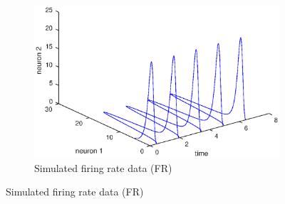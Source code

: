 \begin{figure}[tbh]
        \centering
        \begin{subfigure}[b]{0.475\textwidth}
            \centering
            \includegraphics[width=\textwidth]{./images/SimFiringRate-with-time.eps}
            \caption[]%
            {{\small Simulated firing rate data (FR)}}  
               

\end{subfigure}
\end{figure}
